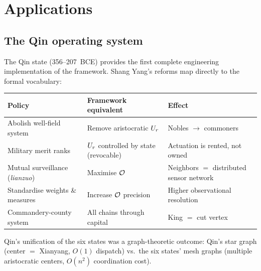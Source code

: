 \chapter{Applications}\label{sec:applications}

\section{The Qin operating system}\label{sec:qin}

The Qin state (356--207~BCE) provides the first complete engineering
implementation of the framework. Shang Yang's reforms map directly to
the formal vocabulary:

\begin{center}
\begin{tabular}{@{}lp{5cm}p{5cm}@{}}
\toprule
\textbf{Policy} & \textbf{Framework equivalent} & \textbf{Effect} \\
\midrule
Abolish well-field system & Remove aristocratic $U_r$ & Nobles
$\to$ commoners \\
Military merit ranks & $U_r$ controlled by state (revocable) &
Actuation is rented, not owned \\
Mutual surveillance (\emph{lianzuo}) & Maximise $\mathcal{O}$ &
Neighbors $=$ distributed sensor network \\
Standardise weights \& measures & Increase $\mathcal{O}$ precision &
Higher observational resolution \\
Commandery-county system & All chains through capital &
King $=$ cut vertex \\
\bottomrule
\end{tabular}
\end{center}

Qin's unification of the six states was a graph-theoretic outcome:
Qin's star graph (center $=$ Xianyang, $O(1)$ dispatch) vs.\ the six
states' mesh graphs (multiple aristocratic centers, $O(n^2)$
coordination cost).

